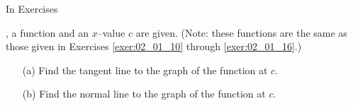 {\noindent In Exercises}
{, a function and an $x$--value $c$ are given. (Note: these functions are the same as those given in Exercises \ref{exer:02_01_10} through \ref{exer:02_01_16}.)
\begin{enumerate}
\item	[(a)] Find  the tangent line to the  graph of  the function at $c$.
\item	[(b)] Find  the normal line to  the graph of the function at $c$.
\end{enumerate}
}
